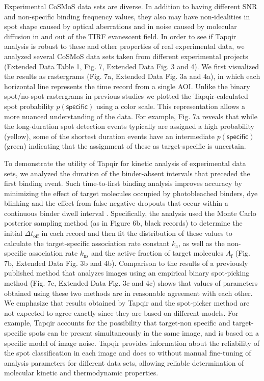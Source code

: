 Experimental CoSMoS data sets are diverse.  In addition to having different SNR and non-specific binding frequency values, they also may have non-idealities in spot shape caused by optical aberrations and in noise caused by molecular diffusion in and out of the TIRF evanescent field.  In order to see if Tapqir analysis is robust to these and other properties of real experimental data, we  analyzed several CoSMoS data sets taken from different experimental projects (Extended Data Table 1, Fig. 7, Extended Data Fig. 3 and 4). We first visualized the results as rastergrams (Fig. 7a, Extended Data Fig. 3a and 4a), in which each horizontal line represents the time record from a single AOI.  Unlike the binary spot/no-spot rastergrams in previous studies \cite{Friedman2013-sf,Rosen2020-zn} we plotted the Tapqir-calculated spot probability $p(\mathsf{specific})$ using a color scale.  This representation allows a more nuanced understanding of the data.  For example, Fig. 7a reveals that while the long-duration spot detection events typically are assigned a high probability (yellow), some of the shortest duration events have an intermediate $p(\mathsf{specific})$ (green) indicating that the assignment of these as target-specific is uncertain.  

To demonstrate the utility of Tapqir for kinetic analysis of experimental data sets, we analyzed the duration of the binder-absent intervals that preceded the first binding event.  Such time-to-first binding analysis improves accuracy by minimizing the effect of target molecules occupied by photobleached binders, dye blinking and the effect from false negative dropouts that occur within a continuous binder dwell interval \cite{Friedman2006-kb}.  Specifically, the analysis used the Monte Carlo posterior sampling method (as in Figure 6b, black records) to determine the initial  $\Delta t_\mathrm{off}$ in each record and then fit the distribution of these values to calculate the target-specific association rate constant $k_\mathrm{a}$, as well as the non-specific association rate $k_\mathrm{ns}$ and the active fraction of target molecules $A_\mathrm{f}$ (Fig. 7b, Extended Data Fig. 3b and 4b). Comparison to the results of a previously published method that analyzes images using an empirical binary spot-picking method \cite{Friedman2006-kb} (Fig. 7c, Extended Data Fig. 3c and 4c) shows that values of parameters obtained using these two methods are in reasonable agreement with each other. We emphasize that results obtained by Tapqir and the spot-picker method are not expected to agree exactly since they are based on different models.  For example, Tapqir accounts for the possibility that target-non specific and target-specific spots can be present simultaneously in the same image, and is based on a specific model of image noise.  Tapqir provides information about the reliability of the spot classification in each image and does so without manual fine-tuning of analysis parameters for different data sets, allowing reliable determination of molecular kinetic and thermodynamic properties.

